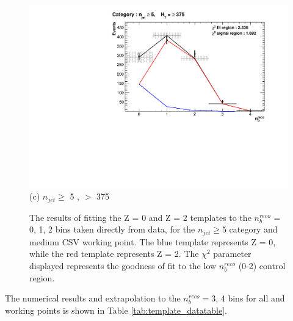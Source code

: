\begin{figure}[ht]
\begin{minipage}[b]{0.51\linewidth}
\includegraphics[width = 1.0\linewidth]{plots/ThesisPlots/Final_Fit_To_Data_Normal_Medium_HTBin_OneMuon_Template_375_jet_mult_5.pdf}
\centering (c) $n_{jet} \geq$ 5 , \theht $>$ 375 
\end{minipage}
\caption[The results of fitting the Z = 0 and Z = 2 templates to the $n_{b}^{reco}$ = 0, 1, 2 bins taken from data, for the $n_{jet} \geq 5$ category and medium \ac{CSV} working point.]{The results of fitting the Z = 0 and Z = 2 templates to the $n_{b}^{reco}$ = 0, 1, 2 bins taken directly from data, for the $n_{jet} \geq 5$ category and medium \ac{CSV} working point. The blue template represents Z = 0, while the red template represents Z = 2. The $\chi^{2}$ parameter displayed represents the goodness of fit to the low $n_{b}^{reco}$ (0-2) control region.}
\label{fig:template_data_med_njet5}
\end{figure}

The numerical results and extrapolation to the $n_{b}^{reco} =$3, 4 bins for all \theht and working points is shown in Table \ref{tab:template_datatable}.

